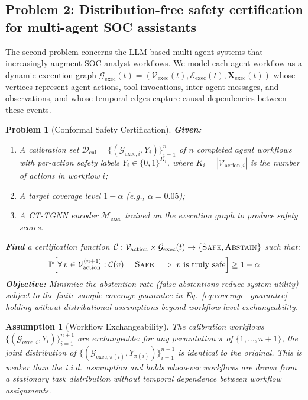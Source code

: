 \documentclass[preprint,review,12pt]{elsarticle}
\newtheorem{assumption}{Assumption}
\newtheorem{problem}{Problem}
\newcommand{\vX}{\mathbf{X}}            %
\newcommand{\Prob}{\mathbb{P}}
\newcommand{\calG}{\mathcal{G}}
\newcommand{\calC}{\mathcal{C}}
\newcommand{\calD}{\mathcal{D}}
\newcommand{\calV}{\mathcal{V}}
\newcommand{\calE}{\mathcal{E}}
\newcommand{\calM}{\mathcal{M}}
\begin{document}
\subsection{Problem 2: Distribution-free safety certification for multi-agent SOC assistants}
\label{subsec:problem2}

The second problem concerns the LLM-based multi-agent systems that increasingly augment SOC analyst workflows. We model each agent workflow as a dynamic execution graph $\calG_{\mathrm{exec}}(t) = (\calV_{\mathrm{exec}}(t), \calE_{\mathrm{exec}}(t), \vX_{\mathrm{exec}}(t))$ whose vertices represent agent actions, tool invocations, inter-agent messages, and observations, and whose temporal edges capture causal dependencies between these events.

\begin{problem}[Conformal Safety Certification]\label{prob:conformal}
\textbf{Given:}
\begin{enumerate}
    \item A calibration set $\calD_{\mathrm{cal}} = \{(\calG_{\mathrm{exec},i}, Y_i)\}_{i=1}^n$ of $n$ completed agent workflows with per-action safety labels $Y_i \in \{0,1\}^{K_i}$, where $K_i = |\calV_{\mathrm{action},i}|$ is the number of actions in workflow $i$;
    \item A target coverage level $1 - \alpha$ (e.g., $\alpha = 0.05$);
    \item A CT-TGNN encoder $\calM_{\mathrm{exec}}$ trained on the execution graph to produce safety scores.
\end{enumerate}
\textbf{Find} a certification function $\calC: \calV_{\mathrm{action}} \times \calG_{\mathrm{exec}}(t) \to \{\textsc{Safe}, \textsc{Abstain}\}$ such that:
\begin{equation}\label{eq:coverage_guarantee}
    \Prob\!\left[\forall\, v \in \calV_{\mathrm{action}}^{(n+1)}: \calC(v) = \textsc{Safe} \implies v \text{ is truly safe}\right] \geq 1 - \alpha
\end{equation}
\textbf{Objective:} Minimize the abstention rate (false abstentions reduce system utility) subject to the finite-sample coverage guarantee in Eq.~\eqref{eq:coverage_guarantee} holding without distributional assumptions beyond workflow-level exchangeability.
\end{problem}

\begin{assumption}[Workflow Exchangeability]\label{asm:exchangeability}
The calibration workflows $\{(\calG_{\mathrm{exec},i}, Y_i)\}_{i=1}^{n+1}$ are exchangeable: for any permutation $\pi$ of $\{1, \ldots, n+1\}$, the joint distribution of $\{(\calG_{\mathrm{exec},\pi(i)}, Y_{\pi(i)})\}_{i=1}^{n+1}$ is identical to the original. This is weaker than the i.i.d.\ assumption and holds whenever workflows are drawn from a stationary task distribution without temporal dependence between workflow assignments.
\end{assumption}
\end{document}
